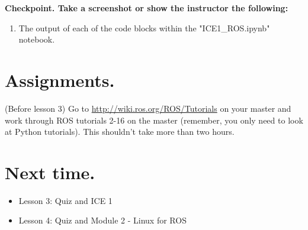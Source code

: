 \documentclass{handout}
\begin{document}
\textbf{Checkpoint. Take a screenshot or show the instructor the following:}
\begin{enumerate}
	\item The output of each of the code blocks within the "ICE1\_ROS.ipynb" notebook.
\end{enumerate}

\section{Assignments.}
	\begin{todolist}
		\item (Before lesson 3) Go to \url{http://wiki.ros.org/ROS/Tutorials} on your master and work through ROS tutorials 2-16 on the master (remember, you only need to look at Python tutorials). This shouldn't take more than two hours.
	\end{todolist}

\section{Next time.}
	\begin{itemize}
		\item Lesson 3: Quiz and ICE 1
		\item Lesson 4: Quiz and Module 2 - Linux for ROS
	\end{itemize}
\end{document}
